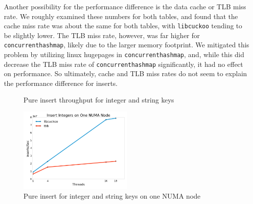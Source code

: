 \documentclass{article}
\newcommand{\tbbmap}{\texttt{concurrent\textunderscore hash\textunderscore map}}
\newcommand{\libcuckoo}{\texttt{libcuckoo}}
\begin{document}
Another possibility for the performance difference is the data cache or TLB miss
rate. We roughly examined these numbers for both tables, and found that the
cache miss rate was about the same for both tables, with {\libcuckoo} tending to
be slightly lower. The TLB miss rate, however, was far higher for {\tbbmap},
likely due to the larger memory footprint. We mitigated this problem by
utilizing linux hugepages in {\tbbmap}, and, while this did decrease the TLB
miss rate of {\tbbmap} significantly, it had no effect on performance. So
ultimately, cache and TLB miss rates do not seem to explain the performance
difference for inserts.

\begin{figure}[!htbp]
  \centering
  \caption{Pure insert throughput for integer and string keys}
  \label{fig:pure-insert}
\end{figure}

\begin{figure}[!htbp]
  \centering
  \includegraphics[width=0.5\textwidth]{insert-integer-one-numa}
  \caption{Pure insert  for integer and string keys on one NUMA node}
  \label{fig:pure-insert-one-numa}
\end{figure}
\end{document}
